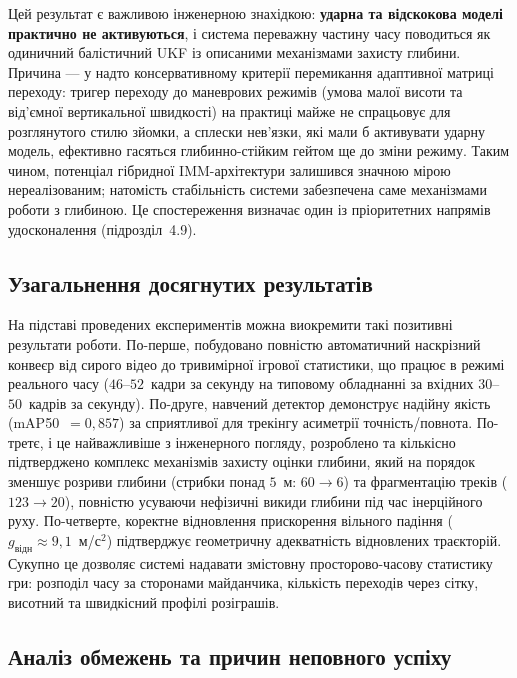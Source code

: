 Цей результат є важливою інженерною знахідкою: \textbf{ударна та відскокова моделі
практично не активуються}, і система переважну частину часу поводиться як одиничний
балістичний \gls{UKF} із описаними механізмами захисту глибини. Причина --- у
надто консервативному критерії перемикання адаптивної матриці переходу: тригер
переходу до маневрових режимів (умова малої висоти та від'ємної вертикальної
швидкості) на практиці майже не спрацьовує для розглянутого стилю зйомки, а сплески
нев'язки, які мали б активувати ударну модель, ефективно гасяться глибинно-стійким
гейтом ще до зміни режиму. Таким чином, потенціал гібридної \gls{IMM}-архітектури
залишився значною мірою нереалізованим; натомість стабільність системи забезпечена
саме механізмами роботи з глибиною. Це спостереження визначає один із пріоритетних
напрямів удосконалення (підрозділ~4.9).

\subsection{Узагальнення досягнутих результатів}

На підставі проведених експериментів можна виокремити такі позитивні результати роботи.
По-перше, побудовано повністю автоматичний наскрізний конвеєр від сирого відео до
тривимірної ігрової статистики, що працює в режимі реального часу ($46$--$52$~кадри за
секунду на типовому обладнанні за вхідних $30$--$50$~кадрів за секунду). По-друге,
навчений детектор демонструє надійну якість (mAP50~$=0{,}857$) за сприятливої для
трекінгу асиметрії точність/повнота. По-третє, і це найважливіше з інженерного погляду,
розроблено та кількісно підтверджено комплекс механізмів захисту оцінки глибини, який
на порядок зменшує розриви глибини (стрибки понад $5$~м: $60 \to 6$) та фрагментацію
треків ($123 \to 20$), повністю усуваючи нефізичні викиди глибини під час інерційного
руху. По-четверте, коректне відновлення прискорення вільного падіння
($g_{\text{відн}} \approx 9{,}1$~м/с$^2$) підтверджує геометричну адекватність відновлених траєкторій.
Сукупно це дозволяє системі надавати змістовну просторово-часову статистику гри:
розподіл часу за сторонами майданчика, кількість переходів через сітку, висотний та
швидкісний профілі розіграшів.

\subsection{Аналіз обмежень та причин неповного успіху}

